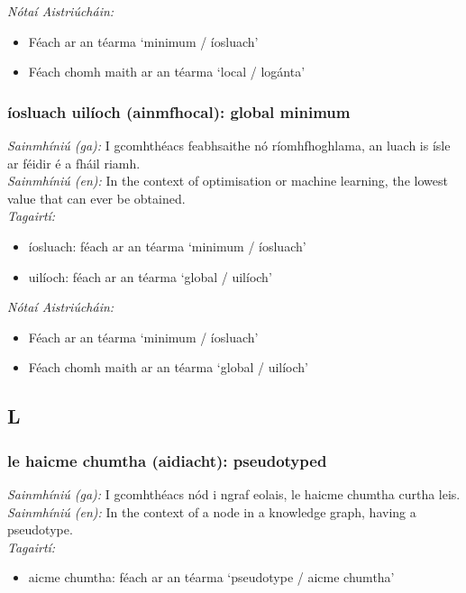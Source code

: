\documentclass{article}
\begin{document}
 \noindent \textit{Nótaí Aistriúcháin:}
\begin{itemize}
	\item Féach ar an téarma `minimum / íosluach'
	\item Féach chomh maith ar an téarma `local / logánta'
\end{itemize}


\subsubsection*{íosluach uilíoch (ainmfhocal): global minimum}
 \noindent \textit{Sainmhíniú (ga):} I gcomhthéacs feabhsaithe nó ríomhfhoghlama, an luach is  ísle ar féidir é a fháil riamh.
\\
 \noindent \textit{Sainmhíniú (en):} In the context of optimisation or machine learning, the lowest value that can ever be obtained.
\\
 \noindent \textit{Tagairtí:}
\begin{itemize}
	\item íosluach: féach ar an téarma `minimum / íosluach'
	\item uilíoch: féach ar an téarma `global / uilíoch'
\end{itemize}

 \noindent \textit{Nótaí Aistriúcháin:}
\begin{itemize}
	\item Féach ar an téarma `minimum / íosluach'
	\item Féach chomh maith ar an téarma `global / uilíoch'
\end{itemize}


\subsection*{L}

\subsubsection*{le haicme chumtha (aidiacht): pseudotyped}
 \noindent \textit{Sainmhíniú (ga):} I gcomhthéacs nód i ngraf eolais, le haicme chumtha curtha leis.
\\
 \noindent \textit{Sainmhíniú (en):} In the context of a node in a knowledge graph, having a pseudotype.
\\
 \noindent \textit{Tagairtí:}
\begin{itemize}
	\item aicme chumtha: féach ar an téarma `pseudotype / aicme chumtha'
\end{itemize}
\end{document}
